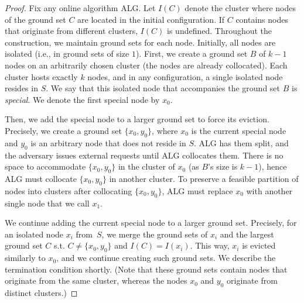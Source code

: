 \documentclass[a4paper,anonymous,USenglish]{lipics-v2019}
\newcommand{\ALG}{\textsc{ALG}\xspace}
\begin{document}
\begin{proof}
	Fix any online algorithm \ALG{}.
	Let $I(C)$ denote the cluster where nodes of the ground set $C$ are located in the initial configuration.
	If $C$ contains nodes that originate from different clusters, $I(C)$ is undefined.
	Throughout the construction, we maintain ground sets for each node.
	Initially, all nodes are isolated (i.e., in ground sets of size $1$).
	First, we create a ground set $B$ of $k-1$ nodes on an arbitrarily chosen cluster (the nodes  are already collocated).
	Each cluster hosts exactly $k$ nodes, and in any configuration, a single isolated node resides in $S$.
	We say that this isolated node that accompanies the ground set $B$ is \emph{special}.
	We denote the first special node by $x_0$.

	Then, we add the special node to a larger ground set to force its eviction.
	Precisely,
	we create a ground set $\{x_0, y_0\}$, 
	where $x_0$ is the current special node and $y_0$ is an arbitrary node that does not reside in $S$.
	\ALG has them split, and the adversary issues external requests until \ALG collocates them.
	There is no space to accommodate $\{x_0, y_0\}$ in the cluster of $x_0$ (as $B$'s size is $k-1$), hence \ALG must collocate $\{x_0, y_0\}$ in another cluster.
	To preserve a feasible partition of nodes into clusters after collocating $\{x_0, y_0\}$,
	\ALG must replace $x_0$ with another single node that we call $x_1$.

	We continue adding the current special node to a larger ground set.
	Precisely, for an isolated node $x_i$ from~$S$, we merge the ground sets of $x_i$ and the largest ground set $C$ s.t. $C \neq \{x_0,y_0\}$ and $I(C) = I(x_i)$.
	This way, $x_i$ is evicted similarly to $x_0$, and we continue creating such ground sets.
	We describe the termination condition shortly.
	(Note that these ground sets contain nodes that originate from the same cluster, whereas the nodes $x_0$ and $y_0$ originate from distinct clusters.)


\end{proof}
\end{document}
